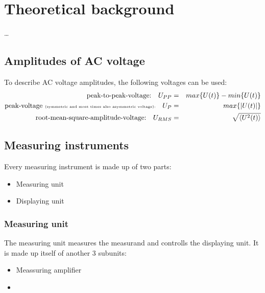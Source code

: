 \section{Theoretical background}
…\subsection{Amplitudes of AC voltage}
To describe AC voltage amplitudes, the following voltages can be used:
\begin{eqnarray*}
	\text{peak-to-peak-voltage:}\quad U_{PP}&=&max\{U(t)\}-min\{U(t)\}\\
	\text{peak-voltage \tiny{(symmetric and most times also asymmetric voltage)}:}\quad U_P&=&max\{|U(t)|\}\\
	\text{root-mean-square-amplitude-voltage:}\quad U_{RMS}&=&\sqrt{\left<U^2(t)\right>}
\end{eqnarray*}
\subsection{Measuring instruments}
Every measuring instrument is made up of two parts:
\begin{itemize}
	\item{Measuring unit}
	\item{Displaying unit}
\end{itemize}
\subsubsection{Measuring unit}
The measuring unit measures the measurand and controlls the displaying unit. It is made up itself of another 3 subunits:
\begin{itemize}
	\item{Meassuring amplifier}
	\item{}
\end{itemize}